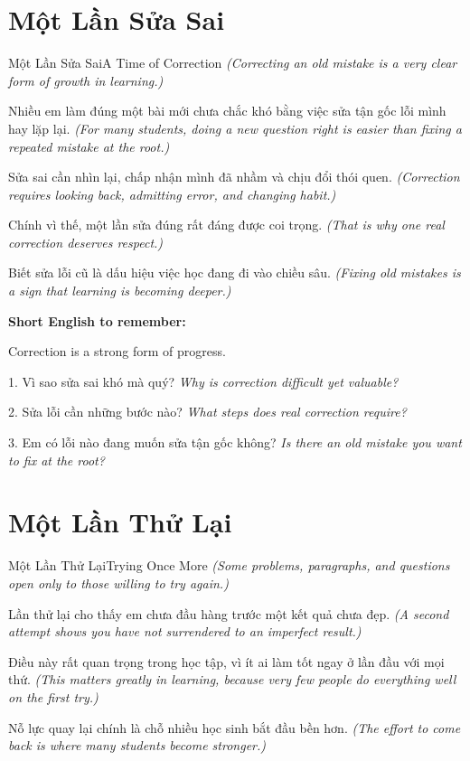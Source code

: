 \section{Một Lần Sửa Sai}
\begin{truyen}{Một Lần Sửa Sai}{A Time of Correction}
\textit{(Correcting an old mistake is a very clear form of growth in learning.)}

Nhiều em làm đúng một bài mới chưa chắc khó bằng việc sửa tận gốc lỗi mình hay lặp lại.
\textit{(For many students, doing a new question right is easier than fixing a repeated mistake at the root.)}

Sửa sai cần nhìn lại, chấp nhận mình đã nhầm và chịu đổi thói quen.
\textit{(Correction requires looking back, admitting error, and changing habit.)}

Chính vì thế, một lần sửa đúng rất đáng được coi trọng.
\textit{(That is why one real correction deserves respect.)}
\end{truyen}

\begin{baihoc}
Biết sửa lỗi cũ là dấu hiệu việc học đang đi vào chiều sâu.
\textit{(Fixing old mistakes is a sign that learning is becoming deeper.)}
\end{baihoc}

\begin{ghinhoanh}
\textbf{Short English to remember:}

Correction is a strong form of progress.

\end{ghinhoanh}

\begin{tuhocnhanh}
1. Vì sao sửa sai khó mà quý? \textit{Why is correction difficult yet valuable?}

2. Sửa lỗi cần những bước nào? \textit{What steps does real correction require?}

3. Em có lỗi nào đang muốn sửa tận gốc không? \textit{Is there an old mistake you want to fix at the root?}
\end{tuhocnhanh}
\ngancach

\section{Một Lần Thử Lại}
\begin{truyen}{Một Lần Thử Lại}{Trying Once More}
\textit{(Some problems, paragraphs, and questions open only to those willing to try again.)}

Lần thử lại cho thấy em chưa đầu hàng trước một kết quả chưa đẹp.
\textit{(A second attempt shows you have not surrendered to an imperfect result.)}

Điều này rất quan trọng trong học tập, vì ít ai làm tốt ngay ở lần đầu với mọi thứ.
\textit{(This matters greatly in learning, because very few people do everything well on the first try.)}

Nỗ lực quay lại chính là chỗ nhiều học sinh bắt đầu bền hơn.
\textit{(The effort to come back is where many students become stronger.)}
\end{truyen}

